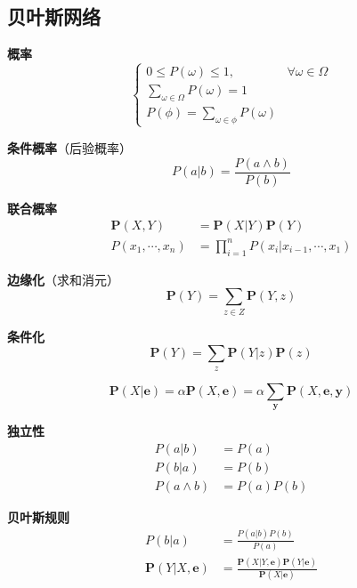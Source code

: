 \documentclass[10pt,a4paper]{ctexart}
\begin{document}
\begin{multicols}{3}
        \subsection{贝叶斯网络}
        \textbf{概率}
        \begin{equation*}
            \begin{cases}
                0\leq P(\omega)\leq 1,&\forall \omega\in\Omega\\
                \sum_{\omega\in\Omega}P(\omega)=1&\\
                P(\phi)=\sum_{\omega\in\phi}P(\omega)&
            \end{cases}
        \end{equation*}

        \textbf{条件概率}（后验概率）
        \begin{equation}\label{eq:condition}
            P(a|b)=\frac{P(a\land b)}{P(b)}
        \end{equation}

        \textbf{联合概率}
        \begin{align*}
            \mathbf{P}(X,Y)&=\mathbf{P}(X|Y)\mathbf{P}(Y)\\
            P(x_1,\cdots,x_n)&=\prod_{i=1}^nP(x_i|x_{i-1},\cdots,x_1)
        \end{align*}
        
        \textbf{边缘化}（求和消元）
        \begin{equation}\label{eq:margin}
            \mathbf{P}(Y)=\sum_{z\in Z}\mathbf{P}(Y,z)
        \end{equation}

        \textbf{条件化}
        \begin{equation*}
            \mathbf{P}(Y)=\sum_{z}\mathbf{P}(Y|z)\mathbf{P}(z)
        \end{equation*}

        \begin{equation*}
            \mathbf{P}(X|\mathbf{e})=\alpha\mathbf{P}(X,\mathbf{e})=\alpha\sum_{\mathbf{y}}\mathbf{P}(X,\mathbf{e},\mathbf{y})
        \end{equation*}

        \textbf{独立性}
        \begin{align*}
            P(a|b)&=P(a)\\
            P(b|a)&=P(b)\\
            P(a\land b)&=P(a)P(b)
        \end{align*}

        \textbf{贝叶斯规则}
        \begin{align*}
            P(b|a)&=\frac{P(a|b)P(b)}{P(a)}\\
            \mathbf{P}(Y|X,\mathbf{e})&=\frac{\mathbf{P}(X|Y,\mathbf{e})\mathbf{P}(Y|\mathbf{e})}{\mathbf{P}(X|\mathbf{e})}
        \end{align*}


\end{multicols}
\end{document}
